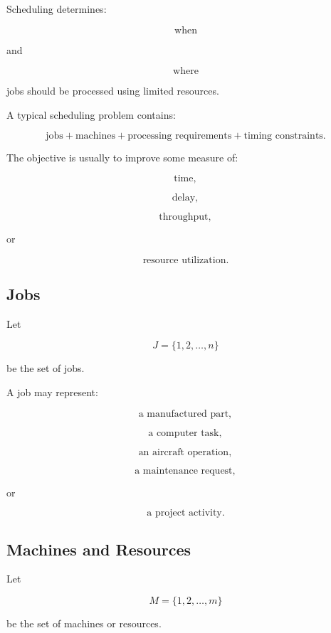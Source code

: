 Scheduling determines:

\[
\boxed{
\text{when}
}
\]

and

\[
\boxed{
\text{where}
}
\]

jobs should be processed using limited resources.

A typical scheduling problem contains:

\[
\boxed{
\text{jobs}
+
\text{machines}
+
\text{processing requirements}
+
\text{timing constraints}.
}
\]

The objective is usually to improve some measure of:

\[
\boxed{
\text{time},
}
\]

\[
\boxed{
\text{delay},
}
\]

\[
\boxed{
\text{throughput},
}
\]

or

\[
\boxed{
\text{resource utilization}.
}
\]

\subsection{Jobs}
\label{subsec:scheduling-jobs}

Let

\[
J
=
\{1,2,\ldots,n\}
\]

be the set of jobs.

A job may represent:

\[
\boxed{
\text{a manufactured part},
}
\]

\[
\boxed{
\text{a computer task},
}
\]

\[
\boxed{
\text{an aircraft operation},
}
\]

\[
\boxed{
\text{a maintenance request},
}
\]

or

\[
\boxed{
\text{a project activity}.
}
\]

\subsection{Machines and Resources}
\label{subsec:scheduling-machines}

Let

\[
M
=
\{1,2,\ldots,m\}
\]

be the set of machines or resources.

